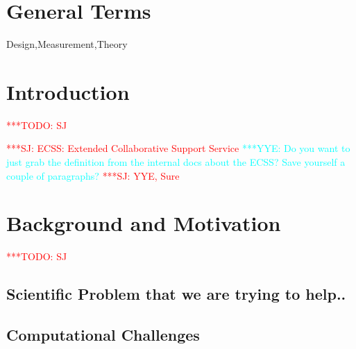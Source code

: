\documentclass{sig-alternate}
\begin{document}
\newif\ifdraft 
\drafttrue 
\ifdraft
\newcommand{\mrnote}[1]{{\textcolor{green} { ***MR: #1 }}}
\newcommand{\jhanote}[1]{ {\textcolor{red} { ***SJ: #1 }}}
\newcommand{\yyenote}[1]{ {\textcolor{cyan} { ***YYE: #1 }}}
\newcommand{\pmnote}[1]{ {\textcolor{blue} { ***PM: #1 }}}
\newcommand{\todo}[1]{ {\textcolor{red} { ***TODO: #1 }}}
\newcommand{\fix}[1]{ {\textcolor{red} { ***FIX: #1 }}}
\newcommand{\reviewer}[1]{} 
\else \newcommand{\yyenote}[1]{}
\newcommand{\mrmnote}[1]{} \newcommand{\pmnote}[1]{}
\newcommand{\jhanote}[1]{} \newcommand{\todo}[1]{ {\textcolor{red} {
      ***TODO: #1 }}} \newcommand{\fix}[1]{} \fi




\section*{General Terms}{Design,Measurement,Theory}

 \keywords{}

\section{Introduction} \todo{SJ}

\jhanote{ECSS: Extended Collaborative Support Service } \yyenote{Do
  you want to just grab the definition from the internal docs about
  the ECSS? Save yourself a couple of paragraphs?}\jhanote{YYE, Sure}


\section{Background and Motivation} \todo{SJ}

\subsection{Scientific Problem that we are trying to help..}

\subsection{Computational Challenges}


\end{document}
